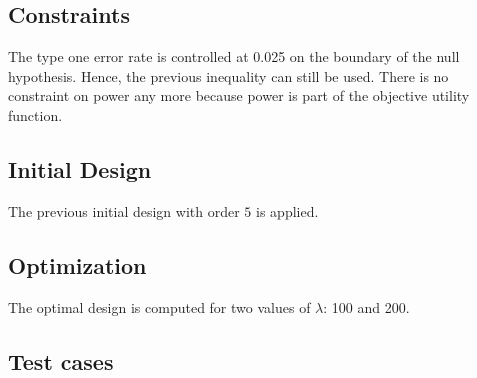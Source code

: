 \documentclass[
]{book}
\newenvironment{Shaded}{\begin{snugshade}}{\end{snugshade}}
\newcommand{\DataTypeTok}[1]{\textcolor[rgb]{0.13,0.29,0.53}{#1}}
\newcommand{\DecValTok}[1]{\textcolor[rgb]{0.00,0.00,0.81}{#1}}
\newcommand{\KeywordTok}[1]{\textcolor[rgb]{0.13,0.29,0.53}{\textbf{#1}}}
\newcommand{\NormalTok}[1]{#1}
\newcommand{\OperatorTok}[1]{\textcolor[rgb]{0.81,0.36,0.00}{\textbf{#1}}}
\newcommand{\StringTok}[1]{\textcolor[rgb]{0.31,0.60,0.02}{#1}}
\begin{document}
\hypertarget{constraints-11}{%
\subsection{Constraints}\label{constraints-11}}

The type one error rate is controlled at 0.025 on the boundary of the
null hypothesis. Hence, the previous inequality can still be used.
There is no constraint on power any more because power is part of the
objective utility function.

\hypertarget{initial-design-9}{%
\subsection{Initial Design}\label{initial-design-9}}

The previous initial design with order \(5\) is applied.

\hypertarget{optimization-10}{%
\subsection{Optimization}\label{optimization-10}}

The optimal design is computed for two values of \(\lambda\): 100 and 200.

\begin{Shaded}
\end{Shaded}

\hypertarget{test-cases-11}{%
\subsection{Test cases}\label{test-cases-11}}
\end{document}
